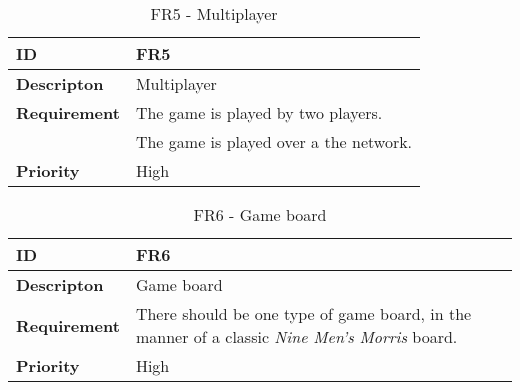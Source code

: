 
\begin{table}[h!]
\begin{tabular}{ | p{90pt} | p{270pt}  |}
\hline
\bf ID &  FR5  \\ \hline
\bf Descripton & Multiplayer \\ \hline 
\bf Requirement & The game is played by two players.  \\   
& The game is played over a the network. \\  \hline
\bf Priority & High \\ \hline

\end{tabular}

\caption{FR5 - Multiplayer}

\end{table}




\begin{table}[h!]
\begin{tabular}{ | p{90pt} | p{270pt}  |}
\hline
\bf ID &  FR6  \\ \hline
\bf Descripton & Game board \\ \hline 
\bf Requirement & There should be one type of game board, in the manner of a classic \emph{Nine Men's Morris} board.\\ \hline
\bf Priority & High \\ \hline

\end{tabular}

\caption{FR6 - Game board}

\end{table}

\newpage



